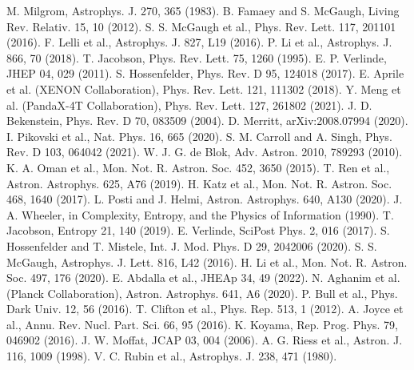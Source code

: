 \documentclass[twocolumn,prd,amsmath,amssymb,aps,superscriptaddress,nofootinbib]{revtex4-2}
\begin{document}

\begin{thebibliography}{50}
 M. Milgrom, Astrophys. J. 270, 365 (1983).
 B. Famaey and S. McGaugh, Living Rev. Relativ. 15, 10 (2012).
 S. S. McGaugh et al., Phys. Rev. Lett. 117, 201101 (2016).
 F. Lelli et al., Astrophys. J. 827, L19 (2016).
 P. Li et al., Astrophys. J. 866, 70 (2018).
 T. Jacobson, Phys. Rev. Lett. 75, 1260 (1995).
 E. P. Verlinde, JHEP 04, 029 (2011).
 S. Hossenfelder, Phys. Rev. D 95, 124018 (2017).
 E. Aprile et al. (XENON Collaboration), Phys. Rev. Lett. 121, 111302 (2018).
 Y. Meng et al. (PandaX-4T Collaboration), Phys. Rev. Lett. 127, 261802 (2021).
 J. D. Bekenstein, Phys. Rev. D 70, 083509 (2004).
 D. Merritt, arXiv:2008.07994 (2020).
 I. Pikovski et al., Nat. Phys. 16, 665 (2020).
 S. M. Carroll and A. Singh, Phys. Rev. D 103, 064042 (2021).
 W. J. G. de Blok, Adv. Astron. 2010, 789293 (2010).
 K. A. Oman et al., Mon. Not. R. Astron. Soc. 452, 3650 (2015).
 T. Ren et al., Astron. Astrophys. 625, A76 (2019).
 H. Katz et al., Mon. Not. R. Astron. Soc. 468, 1640 (2017).
 L. Posti and J. Helmi, Astron. Astrophys. 640, A130 (2020).
 J. A. Wheeler, in Complexity, Entropy, and the Physics of Information (1990).
 T. Jacobson, Entropy 21, 140 (2019).
 E. Verlinde, SciPost Phys. 2, 016 (2017).
 S. Hossenfelder and T. Mistele, Int. J. Mod. Phys. D 29, 2042006 (2020).
 S. S. McGaugh, Astrophys. J. Lett. 816, L42 (2016).
 H. Li et al., Mon. Not. R. Astron. Soc. 497, 176 (2020).
 E. Abdalla et al., JHEAp 34, 49 (2022).
 N. Aghanim et al. (Planck Collaboration), Astron. Astrophys. 641, A6 (2020).
 P. Bull et al., Phys. Dark Univ. 12, 56 (2016).
 T. Clifton et al., Phys. Rep. 513, 1 (2012).
 A. Joyce et al., Annu. Rev. Nucl. Part. Sci. 66, 95 (2016).
 K. Koyama, Rep. Prog. Phys. 79, 046902 (2016).
 J. W. Moffat, JCAP 03, 004 (2006).
 A. G. Riess et al., Astron. J. 116, 1009 (1998).
 V. C. Rubin et al., Astrophys. J. 238, 471 (1980).

\end{thebibliography}
\end{document}
